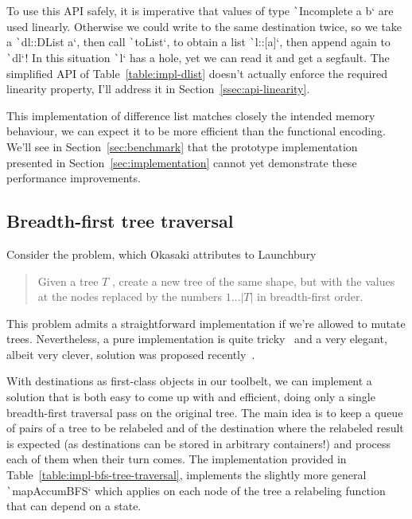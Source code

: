 \documentclass[english]{jflart}
\begin{document}
To use this API safely, it is imperative that values of type \texttt`Incomplete a b` are used linearly. Otherwise we could write to the same destination twice, so we take a \texttt`dl::DList a`, then call \texttt`toList`, to obtain a list \texttt`l::[a]`, then append again to \texttt`dl`! In this situation \texttt`l` has a hole, yet we can read it and get a segfault. The simplified API of Table~\ref{table:impl-dlist} doesn't actually enforce the required linearity property, I'll address it in Section~\ref{ssec:api-linearity}.

This implementation of difference list matches closely the intended memory behaviour, we can expect it to be more efficient than the functional encoding. We'll see in Section~\ref{sec:benchmark} that the prototype implementation presented in Section~\ref{sec:implementation} cannot yet demonstrate these performance improvements.

\subsection{Breadth-first tree traversal}\label{ssec:bf-tree-traversal}

Consider the problem, which Okasaki attributes to Launchbury~\cite{okasaki_bfs_2000}
\begin{quote}
  Given a tree $T$ , create a new tree of the same
  shape, but with the values at the nodes replaced
  by the numbers $1\ldots|T|$ in breadth-first order.
\end{quote}

This problem admits a straightforward implementation if we're allowed
to mutate trees. Nevertheless, a pure implementation is quite
tricky~\cite{okasaki_bfs_2000,jones_gibbons_linearbfs_93} and a very
elegant, albeit very clever, solution was proposed
recently~\cite{gibbons_phases_2023}.



With destinations as first-class objects in our toolbelt, we can
implement a solution that is both easy to come up with and efficient,
doing only a single breadth-first traversal pass on the original
tree. The main idea is to keep a queue of pairs of a tree to be
relabeled and of the destination where the relabeled result is
expected (as destinations can be stored in arbitrary containers!) and
process each of them when their turn comes. The implementation
provided in Table~\ref{table:impl-bfs-tree-traversal}, implements the
slightly more general \texttt`mapAccumBFS` which applies
on each node of the tree a relabeling function that can depend on a
state.
\end{document}
